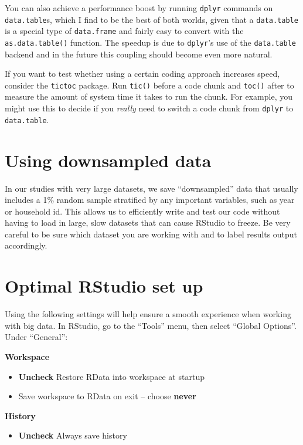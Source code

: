 \documentclass[]{book}
\providecommand{\tightlist}{%
  \setlength{\itemsep}{0pt}\setlength{\parskip}{0pt}}
\begin{document}
You can also achieve a performance boost by running \texttt{dplyr}
commands on \texttt{data.table}s, which I find to be the best of both
worlds, given that a \texttt{data.table} is a special type of
\texttt{data.frame} and fairly easy to convert with the
\texttt{as.data.table()} function. The speedup is due to
\texttt{dplyr}'s use of the \texttt{data.table} backend and in the
future this coupling should become even more natural.

If you want to test whether using a certain coding approach increases
speed, consider the \texttt{tictoc} package. Run \texttt{tic()} before a
code chunk and \texttt{toc()} after to measure the amount of system time
it takes to run the chunk. For example, you might use this to decide if
you \emph{really} need to switch a code chunk from \texttt{dplyr} to
\texttt{data.table}.

\section{Using downsampled data}\label{using-downsampled-data}

In our studies with very large datasets, we save ``downsampled'' data
that usually includes a 1\% random sample stratified by any important
variables, such as year or household id. This allows us to efficiently
write and test our code without having to load in large, slow datasets
that can cause RStudio to freeze. Be very careful to be sure which
dataset you are working with and to label results output accordingly.

\section{Optimal RStudio set up}\label{optimal-rstudio-set-up}

Using the following settings will help ensure a smooth experience when
working with big data. In RStudio, go to the ``Tools'' menu, then select
``Global Options''. Under ``General'':

\textbf{Workspace}

\begin{itemize}
\tightlist
\item
  \textbf{Uncheck} Restore RData into workspace at startup
\item
  Save workspace to RData on exit -- choose \textbf{never}
\end{itemize}

\textbf{History}

\begin{itemize}
\tightlist
\item
  \textbf{Uncheck} Always save history
\end{itemize}
\end{document}
